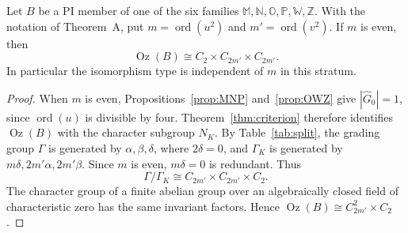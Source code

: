 \begin{proposition}\label{prop:two-param-even-m-structure}
Let $B$ be a PI member of one of the six families
$\mathbb M,\mathbb N,\mathbb O,\mathbb P,\mathbb W,\mathbb Z$.
With the notation of Theorem~A, put $m=\operatorname{ord}(u^2)$ and
$m'=\operatorname{ord}(v^2)$. If $m$ is even, then
\[
 \operatorname{Oz}(B)\cong
 C_2\times C_{2m'}\times C_{2m'}.
\]
In particular the isomorphism type is independent of $m$ in this stratum.
\end{proposition}
\begin{proof}
When $m$ is even, Propositions~\ref{prop:MNP} and~\ref{prop:OWZ}
give $|\widehat G_0|=1$, since $\operatorname{ord}(u)$ is divisible by
four. Theorem~\ref{thm:criterion} therefore identifies
$\operatorname{Oz}(B)$ with the character subgroup $N_K$.
By Table~\ref{tab:split}, the grading group $\Gamma$ is generated by
$\alpha,\beta,\delta$, where $2\delta=0$, and $\Gamma_K$ is generated
by $m\delta,2m'\alpha,2m'\beta$. Since $m$ is even, $m\delta=0$ is
redundant. Thus
\[
 \Gamma/\Gamma_K\cong C_{2m'}\times C_{2m'}\times C_2.
\]
The character group of a finite abelian group over an algebraically
closed field of characteristic zero has the same invariant factors.
Hence $\operatorname{Oz}(B)\cong C_{2m'}^2\times C_2$.
\end{proof}

